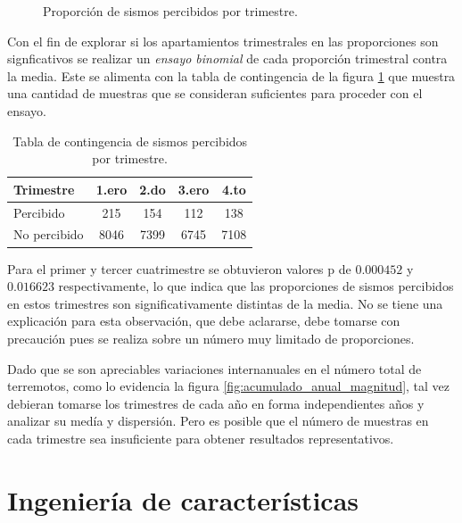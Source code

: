 \documentclass[a4paper]{report}
\begin{document}
\begin{figure}[!ht]
	\centering
	
	\vspace{-0.8cm}
	\caption{Proporción de sismos percibidos por trimestre.}
	\label{fig:percibidos_trimestre_histrograma}
\end{figure}

Con el fin de explorar si los apartamientos trimestrales en las proporciones son signficativos se realizar un \emph{ensayo binomial} de cada proporción trimestral contra la media.
Este se alimenta con la tabla de contingencia de la figura \ref{fig:tabla_contingencia_trimestre} que muestra una cantidad de muestras que se consideran suficientes para proceder con el ensayo.

\begin{table}[!ht]
	\centering
	\begin{tabular}{lcccc}
		\toprule
		Trimestre & 1.ero & 2.do & 3.ero & 4.to \\
		\midrule
		Percibido & 215 & 154 & 112 & 138 \\
		No percibido & 8046 & 7399 & 6745 & 7108 \\
		\bottomrule
	\end{tabular}
	\caption{Tabla de contingencia de sismos percibidos por trimestre.}
	\label{fig:tabla_contingencia_trimestre}
\end{table}

Para el primer y tercer cuatrimestre se obtuvieron valores p de \(0.000452\) y \(0.016623\) respectivamente, lo que indica que las proporciones de sismos percibidos en estos trimestres son significativamente distintas de la media.
No se tiene una explicación para esta observación, que debe aclararse, debe tomarse con precaución pues se realiza sobre un número muy limitado de proporciones.

Dado que se son apreciables variaciones internanuales en el número total de terremotos, como lo evidencia la figura \ref{fig:acumulado_anual_magnitud}, tal vez debieran tomarse los trimestres de cada año en forma independientes años y analizar su medía y dispersión.
Pero es posible que el número de muestras en cada trimestre sea insuficiente para obtener resultados representativos. 



\section{Ingeniería de características}\label{sec:ingeniería}
\end{document}
